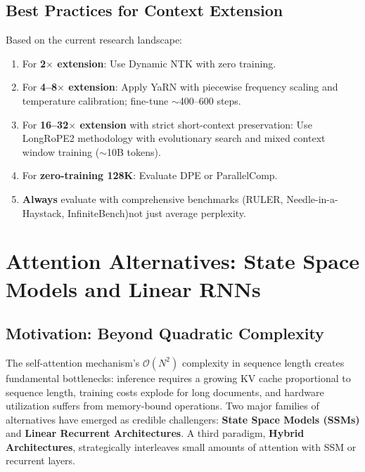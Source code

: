 \documentclass[11pt,a4paper]{article}
\begin{document}
\subsection{Best Practices for Context Extension}

Based on the current research landscape:

\begin{enumerate}[leftmargin=*]
    \item For \textbf{2$\times$ extension}: Use Dynamic NTK with zero training.
    \item For \textbf{4--8$\times$ extension}: Apply YaRN with piecewise frequency scaling and temperature calibration; fine-tune $\sim$400--600 steps.
    \item For \textbf{16--32$\times$ extension} with strict short-context preservation: Use LongRoPE2 methodology with evolutionary search and mixed context window training ($\sim$10B tokens).
    \item For \textbf{zero-training 128K}: Evaluate DPE or ParallelComp.
    \item \textbf{Always} evaluate with comprehensive benchmarks (RULER, Needle-in-a-Haystack, InfiniteBench)\textemdash not just average perplexity.
\end{enumerate}

\section{Attention Alternatives: State Space Models and Linear RNNs}
\label{sec:alternatives}

\subsection{Motivation: Beyond Quadratic Complexity}

The self-attention mechanism's $\mathcal{O}(N^2)$ complexity in sequence length creates fundamental bottlenecks: inference requires a growing KV cache proportional to sequence length, training costs explode for long documents, and hardware utilization suffers from memory-bound operations. Two major families of alternatives have emerged as credible challengers: \textbf{State Space Models (SSMs)} and \textbf{Linear Recurrent Architectures}. A third paradigm, \textbf{Hybrid Architectures}, strategically interleaves small amounts of attention with SSM or recurrent layers.
\end{document}
